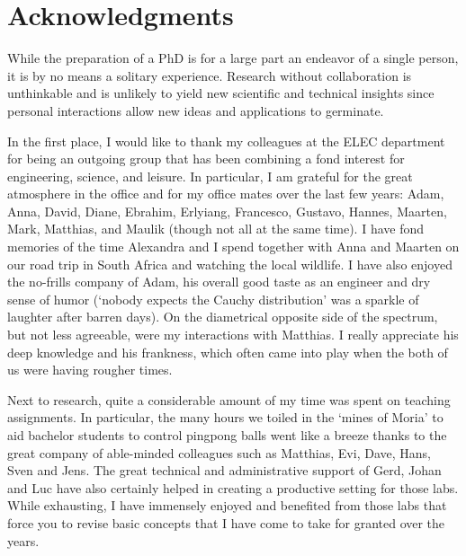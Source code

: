 \chapter*{Acknowledgments}

While the preparation of a PhD is for a large part an endeavor of a single person, it is by no means a solitary experience.
Research without collaboration is unthinkable and is unlikely to yield new scientific and technical insights since personal interactions allow new ideas and applications to germinate.

In the first place, I would like to thank my colleagues at the ELEC department for being an outgoing group that has been combining a fond interest for engineering, science, and leisure.
In particular, I am grateful for the great atmosphere in the office and for my office mates over the last few years: Adam, Anna, David, Diane, Ebrahim, Erlyiang, Francesco, Gustavo, Hannes, Maarten, Mark, Matthias, and Maulik (though not all at the same time).
I have fond memories of the time Alexandra and I spend together with Anna and Maarten on our road trip in South Africa and watching the local wildlife.
I have also enjoyed the no-frills company of Adam, his overall good taste as an engineer and dry sense of humor (`nobody expects the Cauchy distribution' was a sparkle of laughter after barren days).
On the diametrical opposite side of the spectrum, but not less agreeable, were my interactions with Matthias.
I really appreciate his deep knowledge and his frankness, which often came into play when the both of us were having rougher times.

Next to research, quite a considerable amount of my time was spent on teaching assignments.
In particular, the many hours we toiled in the `mines of Moria' to aid bachelor students to control pingpong balls went like a breeze thanks to the great company of able-minded colleagues such as Matthias, Evi, Dave, Hans, Sven and Jens.
The great technical and administrative support of Gerd, Johan and Luc have also certainly helped in creating a productive setting for those labs.
While exhausting, I have immensely enjoyed and benefited from those labs that force you to revise basic concepts that I have come to take for granted over the years.

